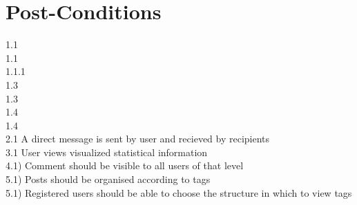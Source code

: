 \documentclass{scrreprt}
\begin{document}
\section{Post-Conditions}								%
1.1\\
1.1\\
1.1.1\\
1.3\\
1.3\\
1.4\\
1.4\\
2.1 A direct message is sent by user and recieved by recipients\\
3.1 User views visualized statistical information\\
4.1) Comment should be visible to all users of that level\\
5.1) Posts should be organised according to tags\\
5.1) Registered users should be able to choose the structure in which to view tags\\
\end{document}
